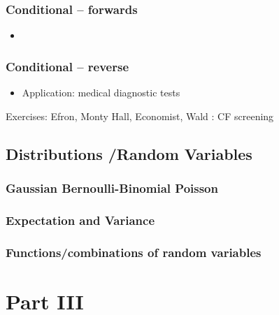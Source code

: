 \documentclass[]{book}
\providecommand{\tightlist}{%
  \setlength{\itemsep}{0pt}\setlength{\parskip}{0pt}}
\begin{document}
\hypertarget{conditional-forwards}{%
\section{Conditional -- forwards}\label{conditional-forwards}}

\begin{itemize}
\item
\end{itemize}

\hypertarget{conditional-reverse}{%
\section{Conditional -- reverse}\label{conditional-reverse}}

\begin{itemize}
\tightlist
\item
  Application: medical diagnostic tests
\end{itemize}

Exercises: Efron, Monty Hall, Economist,
Wald : CF screening

\hypertarget{Distributions}{%
\chapter{Distributions /Random Variables}\label{Distributions}}

\hypertarget{gaussian-bernoulli-binomial-poisson}{%
\section{Gaussian Bernoulli-Binomial Poisson}\label{gaussian-bernoulli-binomial-poisson}}

\hypertarget{expectation-and-variance}{%
\section{Expectation and Variance}\label{expectation-and-variance}}

\hypertarget{functionscombinations-of-random-variables}{%
\section{Functions/combinations of random variables}\label{functionscombinations-of-random-variables}}

\hypertarget{part-part-iii}{%
\part{Part III}\label{part-part-iii}}
\end{document}
